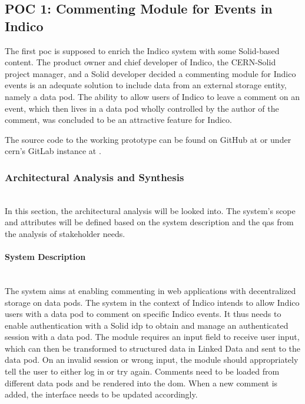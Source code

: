 \subsection{POC 1: Commenting Module for Events in Indico}\label{poc1}

The first \gls{poc} is supposed to enrich the Indico system with some Solid-based content. The product owner and chief developer of Indico, the CERN-Solid project manager, and a Solid developer decided a commenting module for Indico events is an adequate solution to include data from an external storage entity, namely a data pod. The ability to allow users of Indico to leave a comment on an event, which then lives in a data pod wholly controlled by the author of the comment, was concluded to be an attractive feature for Indico.

The source code to the working prototype can be found on GitHub at \cite{solid-comment} or under \gls{cern}'s GitLab instance at \cite{solid-comment-cern}.
\vspace{0.5cm}
\subsubsection{Architectural Analysis and Synthesis}\mbox{}\\

In this section, the architectural analysis will be looked into. The system's scope and attributes will be defined based on the system description and the \glspl{qa} from the analysis of stakeholder needs.
\vspace{0.5cm}
\paragraph{System Description}\mbox{}\\

The system aims at enabling commenting in web applications with decentralized storage on data pods. The system in the context of Indico intends to allow Indico users with a data pod to comment on specific Indico events. It thus needs to enable authentication with a Solid \gls{idp} to obtain and manage an authenticated session with a data pod. The module requires an input field to receive user input, which can then be transformed to structured data in Linked Data and sent to the data pod. On an invalid session or wrong input, the module should appropriately tell the user to either log in or try again. Comments need to be loaded from different data pods and be rendered into the \gls{dom}. When a new comment is added, the interface needs to be updated accordingly.
\vspace{0.5cm}
